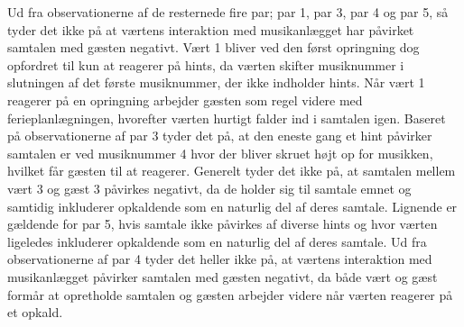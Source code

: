 Ud fra observationerne af de resternede fire par; par 1, par 3, par 4 og par 5, så tyder det ikke på at værtens interaktion med musikanlægget har påvirket samtalen med gæsten negativt. Vært 1 bliver ved den først opringning dog opfordret til kun at reagerer på hints, da værten skifter musiknummer i slutningen af det første musiknummer, der ikke indholder hints. Når vært 1 reagerer på en opringning arbejder gæsten som regel videre med ferieplanlægningen, hvorefter værten hurtigt falder ind i samtalen igen. Baseret på observationerne af par 3 tyder det på, at den eneste gang et hint påvirker samtalen er ved musiknummer 4 hvor der bliver skruet højt op for musikken, hvilket får gæsten til at reagerer. Generelt tyder det ikke på, at samtalen mellem vært 3 og gæst 3 påvirkes negativt, da de holder sig til samtale emnet og samtidig inkluderer opkaldende som en naturlig del af deres samtale. Lignende er gældende for par 5, hvis samtale ikke påvirkes af diverse hints og hvor værten ligeledes inkluderer opkaldende som en naturlig del af deres samtale. Ud fra observationerne af par 4 tyder det heller ikke på, at værtens interaktion med musikanlægget påvirker samtalen med gæsten negativt, da både vært og gæst formår at opretholde samtalen og gæsten arbejder videre når værten reagerer på et opkald.     